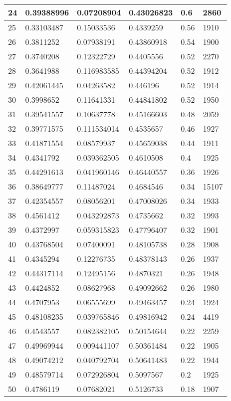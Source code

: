 \begin{longtable}{|l|l|l|l|l|l|}
24 & 0.39388996 & 0.07208904 & 0.43026823 & 0.6 & 2860 \\ \hline 
25 & 0.33103487 & 0.15033536 & 0.4339259 & 0.56 & 1910 \\ \hline 
26 & 0.3811252 & 0.07938191 & 0.43860918 & 0.54 & 1900 \\ \hline 
27 & 0.3740208 & 0.12322729 & 0.4405556 & 0.52 & 2270 \\ \hline 
28 & 0.3641988 & 0.116983585 & 0.44394204 & 0.52 & 1912 \\ \hline 
29 & 0.42061445 & 0.04263582 & 0.446196 & 0.52 & 1914 \\ \hline 
30 & 0.3998652 & 0.11641331 & 0.44841802 & 0.52 & 1950 \\ \hline 
31 & 0.39541557 & 0.10637778 & 0.45166603 & 0.48 & 2059 \\ \hline 
32 & 0.39771575 & 0.111534014 & 0.4535657 & 0.46 & 1927 \\ \hline 
33 & 0.41871554 & 0.08579937 & 0.45659038 & 0.44 & 1911 \\ \hline 
34 & 0.4341792 & 0.039362505 & 0.4610508 & 0.4 & 1925 \\ \hline 
35 & 0.44291613 & 0.041960146 & 0.46440557 & 0.36 & 1926 \\ \hline 
36 & 0.38649777 & 0.11487024 & 0.4684546 & 0.34 & 15107 \\ \hline 
37 & 0.42354557 & 0.08056201 & 0.47008026 & 0.34 & 1933 \\ \hline 
38 & 0.4561412 & 0.043292873 & 0.4735662 & 0.32 & 1993 \\ \hline 
39 & 0.4372997 & 0.059315823 & 0.47796407 & 0.32 & 1901 \\ \hline 
40 & 0.43768504 & 0.07400091 & 0.48105738 & 0.28 & 1908 \\ \hline 
41 & 0.4345294 & 0.12276735 & 0.48378143 & 0.26 & 1937 \\ \hline 
42 & 0.44317114 & 0.12495156 & 0.4870321 & 0.26 & 1948 \\ \hline 
43 & 0.4424852 & 0.08627968 & 0.49092662 & 0.26 & 1980 \\ \hline 
44 & 0.4707953 & 0.06555699 & 0.49463457 & 0.24 & 1924 \\ \hline 
45 & 0.48108235 & 0.039765846 & 0.49816942 & 0.24 & 4419 \\ \hline 
46 & 0.4543557 & 0.082382105 & 0.50154644 & 0.22 & 2259 \\ \hline 
47 & 0.49969944 & 0.009441107 & 0.50361484 & 0.22 & 1905 \\ \hline 
48 & 0.49074212 & 0.040792704 & 0.50641483 & 0.22 & 1944 \\ \hline 
49 & 0.48579714 & 0.072926804 & 0.5097567 & 0.2 & 1925 \\ \hline 
50 & 0.4786119 & 0.07682021 & 0.5126733 & 0.18 & 1907 \\ \hline 
\end{longtable}